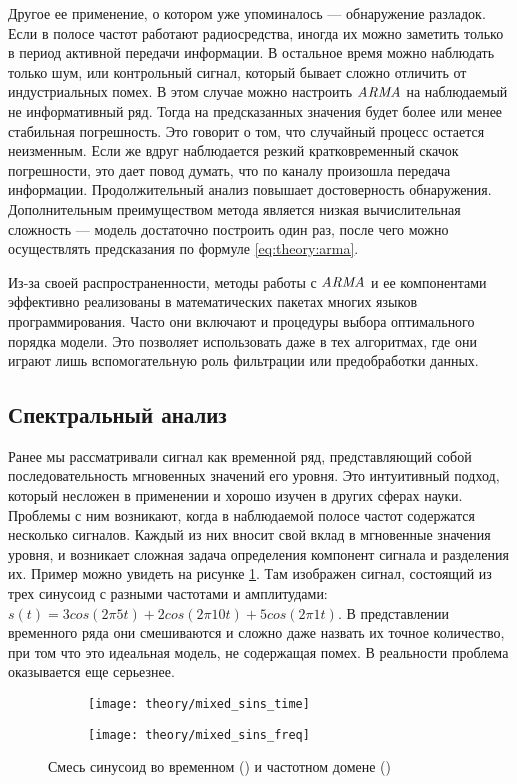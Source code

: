 Другое ее применение, о котором уже упоминалось --- обнаружение разладок. Если в полосе частот работают радиосредства, иногда их можно заметить только в период активной передачи информации. В остальное время можно наблюдать только шум, или контрольный сигнал, который бывает сложно отличить от индустриальных помех. В этом случае можно настроить $\mathit{ARMA}$ на наблюдаемый не информативный ряд. Тогда на предсказанных значения будет более или менее стабильная погрешность. Это говорит о том, что случайный процесс остается неизменным. Если же вдруг наблюдается резкий кратковременный скачок погрешности, это дает повод думать, что по каналу произошла передача информации. Продолжительный анализ повышает достоверность обнаружения. Дополнительным преимуществом метода является низкая вычислительная сложность --- модель достаточно построить один раз, после чего можно осуществлять предсказания по формуле \ref{eq:theory:arma}.

Из-за своей распространенности, методы работы с $\mathit{ARMA}$ и ее компонентами эффективно реализованы в математических пакетах многих языков программирования. Часто они включают и процедуры выбора оптимального порядка модели. Это позволяет использовать даже в тех алгоритмах, где они играют лишь вспомогательную роль фильтрации или предобработки данных.


\subsection{Спектральный анализ}

Ранее мы рассматривали сигнал как временной ряд, представляющий собой последовательность мгновенных значений его уровня. Это интуитивный подход, который несложен в применении и хорошо изучен в других сферах науки. Проблемы с ним возникают, когда в наблюдаемой полосе частот содержатся несколько сигналов. Каждый из них вносит свой вклад в мгновенные значения уровня, и возникает сложная задача определения компонент сигнала и разделения их. Пример можно увидеть на рисунке \ref{fig:theory:mixed_sins_time}. Там изображен сигнал, состоящий из трех синусоид с разными частотами и амплитудами: $s(t) = 3cos(2\pi 5 t) + 2cos(2\pi 10 t) + 5cos(2\pi 1 t)$. В представлении временного ряда они смешиваются и сложно даже назвать их точное количество, при том что это идеальная модель, не содержащая помех. В реальности проблема оказывается еще серьезнее.

\begin{figure}[h]
  \centering
  \begin{subfigure}{0.45\textwidth}
    \texttt{[image: theory/mixed\_sins\_time]}
    \caption{}
    \label{fig:theory:mixed_sins_time}
  \end{subfigure}
  \begin{subfigure}{0.45\textwidth}
    \texttt{[image: theory/mixed\_sins\_freq]}
    \caption{}
    \label{fig:theory:mixed_sins_freq}
  \end{subfigure}
  \caption{Смесь синусоид во временном () и частотном домене ()}
  \label{fig:theory:mixed_sins}
\end{figure}

